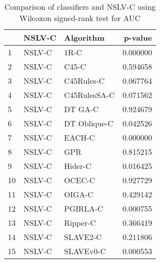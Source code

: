 \begin{table}
\footnotesize
\caption{Comparison of classifiers and NSLV-C using Wilcoxon signed-rank test for AUC}
\label{tab:NSLV-C wilcoxon AUC comparison}
\begin{tabular}{lllr}
\hline
 & NSLV-C & Algorithm & p-value \\
\hline
1 & NSLV-C & 1R-C & 0.000000 \\
2 & NSLV-C & C45-C & 0.594658 \\
3 & NSLV-C & C45Rules-C & 0.067764 \\
4 & NSLV-C & C45RulesSA-C & 0.071562 \\
5 & NSLV-C & DT GA-C & 0.924679 \\
6 & NSLV-C & DT Oblique-C & 0.042526 \\
7 & NSLV-C & EACH-C & 0.000000 \\
8 & NSLV-C & GPR & 0.815215 \\
9 & NSLV-C & Hider-C & 0.016425 \\
10 & NSLV-C & OCEC-C & 0.927729 \\
11 & NSLV-C & OIGA-C & 0.429142 \\
12 & NSLV-C & PGIRLA-C & 0.000755 \\
13 & NSLV-C & Ripper-C & 0.366419 \\
14 & NSLV-C & SLAVE2-C & 0.211806 \\
15 & NSLV-C & SLAVEv0-C & 0.000553 \\
\hline
\end{tabular}
\end{table}
